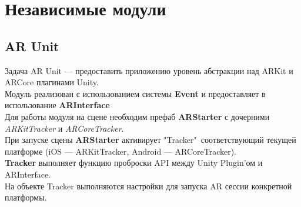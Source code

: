 \documentclass[a4paper, 11pt, titlepage]{article}
\begin{document}
{\begin{center}
      \end{center}
    }
  \section{Независимые модули}
    \subsection{AR Unit}
      Задача AR Unit --- предоставить приложению уровень абстракции над ARKit и ARCore плагинами Unity. \\
      Модуль реализован с использованием системы \textbf{Event} и предоставляет в использование \textbf{ARInterface} \\
      Для работы модуля на сцене необходим префаб \textbf{ARStarter} с дочерними \textit{ARKitTracker} и 
      \textit{ARCoreTracker}. \\
      При запуске сцены \textbf{ARStarter} активирует "Tracker"\ соответствующий текущей платформе (iOS ---  ARKitTracker, Android --- ARCoreTracker).\\
      \textbf{Tracker} выполняет функцию проброски API между Unity Plugin'ом и ARInterface. \\
      На объекте Tracker выполняются настройки для запуска AR сессии конкретной платформы.
\end{document}
